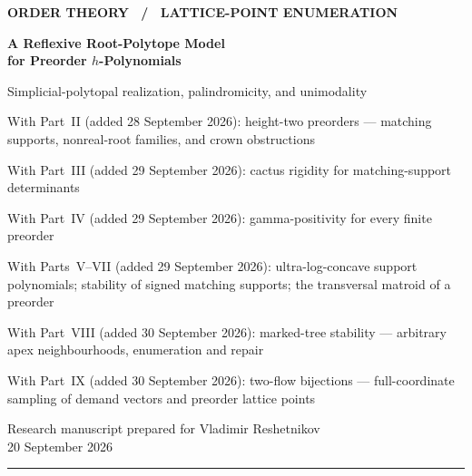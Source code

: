 \documentclass[11pt]{article}
\numberwithin{equation}{section}
\theoremstyle{definition}
\begin{document}
\thispagestyle{empty}
\begin{flushleft}
{\small\sffamily\bfseries\color{Accent} ORDER THEORY \ / \ LATTICE-POINT ENUMERATION}\par
\vspace{10pt}
{\LARGE\bfseries\color{Ink} A Reflexive Root-Polytope Model\\[4pt]
for Preorder $h$-Polynomials}\par
\vspace{9pt}
{\large Simplicial-polytopal realization, palindromicity, and unimodality}\par
\vspace{5pt}
{\normalsize\color{Ink} With Part~II (added 28 September 2026): height-two preorders ---
matching supports, nonreal-root families, and crown obstructions}\par
\vspace{3pt}
{\normalsize\color{Ink} With Part~III (added 29 September 2026): cactus rigidity for
matching-support determinants}\par
\vspace{3pt}
{\normalsize\color{Ink} With Part~IV (added 29 September 2026): gamma-positivity for
every finite preorder}\par
\vspace{3pt}
{\normalsize\color{Ink} With Parts~V--VII (added 29 September 2026): ultra-log-concave support
polynomials; stability of signed matching supports; the transversal matroid of a preorder}\par
\vspace{3pt}
{\normalsize\color{Ink} With Part~VIII (added 30 September 2026): marked-tree stability ---
arbitrary apex neighbourhoods, enumeration and repair}\par
\vspace{3pt}
{\normalsize\color{Ink} With Part~IX (added 30 September 2026): two-flow bijections ---
full-coordinate sampling of demand vectors and preorder lattice points}\par
\vspace{9pt}
{\color{Muted}Research manuscript prepared for Vladimir Reshetnikov\\
20 September 2026}
\end{flushleft}
\vspace{3pt}
\hrule
\vspace{12pt}
\end{document}
